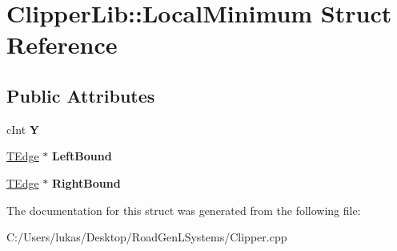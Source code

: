 \hypertarget{struct_clipper_lib_1_1_local_minimum}{}\section{Clipper\+Lib\+:\+:Local\+Minimum Struct Reference}
\label{struct_clipper_lib_1_1_local_minimum}
\subsection*{Public Attributes}
\begin{DoxyCompactItemize}
\item 
\hypertarget{struct_clipper_lib_1_1_local_minimum_a71836a7c572ddfcf8853accb7314b7cf}{}\label{struct_clipper_lib_1_1_local_minimum_a71836a7c572ddfcf8853accb7314b7cf} 
c\+Int {\bfseries Y}
\item 
\hypertarget{struct_clipper_lib_1_1_local_minimum_a0e7b997adca472b6e80f3223c45965ea}{}\label{struct_clipper_lib_1_1_local_minimum_a0e7b997adca472b6e80f3223c45965ea} 
\hyperlink{struct_clipper_lib_1_1_t_edge}{T\+Edge} $\ast$ {\bfseries Left\+Bound}
\item 
\hypertarget{struct_clipper_lib_1_1_local_minimum_ade212cfb8c35da168b2bf20ad3e0ac94}{}\label{struct_clipper_lib_1_1_local_minimum_ade212cfb8c35da168b2bf20ad3e0ac94} 
\hyperlink{struct_clipper_lib_1_1_t_edge}{T\+Edge} $\ast$ {\bfseries Right\+Bound}
\end{DoxyCompactItemize}


The documentation for this struct was generated from the following file\+:\begin{DoxyCompactItemize}
\item 
C\+:/\+Users/lukas/\+Desktop/\+Road\+Gen\+L\+Systems/Clipper.\+cpp\end{DoxyCompactItemize}
